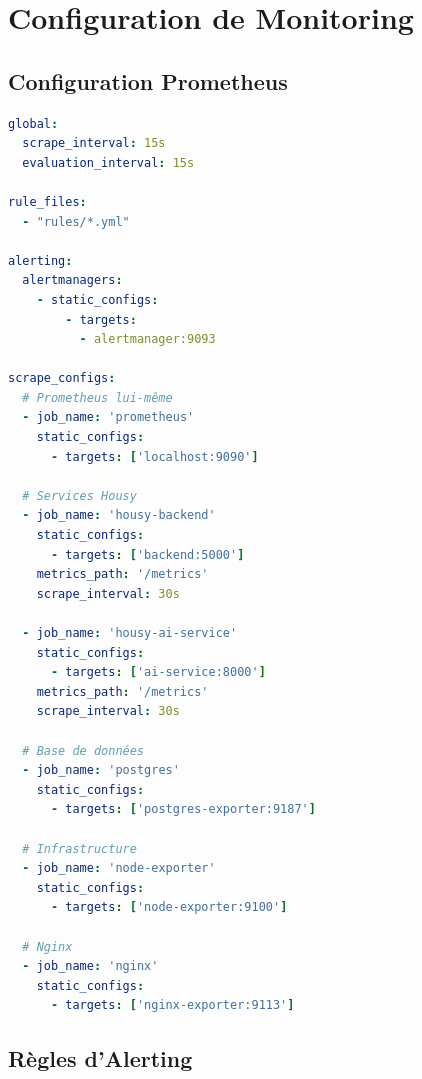 \section{Configuration de Monitoring}

\subsection{Configuration Prometheus}

\begin{lstlisting}[language=yaml, caption=prometheus.yml]
global:
  scrape_interval: 15s
  evaluation_interval: 15s

rule_files:
  - "rules/*.yml"

alerting:
  alertmanagers:
    - static_configs:
        - targets:
          - alertmanager:9093

scrape_configs:
  # Prometheus lui-même
  - job_name: 'prometheus'
    static_configs:
      - targets: ['localhost:9090']

  # Services Housy
  - job_name: 'housy-backend'
    static_configs:
      - targets: ['backend:5000']
    metrics_path: '/metrics'
    scrape_interval: 30s

  - job_name: 'housy-ai-service'
    static_configs:
      - targets: ['ai-service:8000']
    metrics_path: '/metrics'
    scrape_interval: 30s

  # Base de données
  - job_name: 'postgres'
    static_configs:
      - targets: ['postgres-exporter:9187']

  # Infrastructure
  - job_name: 'node-exporter'
    static_configs:
      - targets: ['node-exporter:9100']

  # Nginx
  - job_name: 'nginx'
    static_configs:
      - targets: ['nginx-exporter:9113']
\end{lstlisting}

\subsection{Règles d'Alerting}

